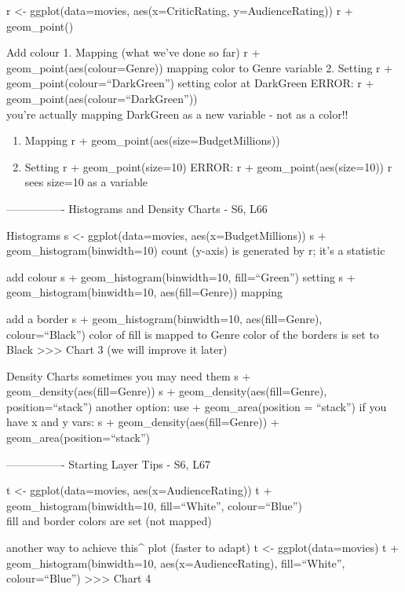 \documentclass[]{article}
\providecommand{\tightlist}{%
  \setlength{\itemsep}{0pt}\setlength{\parskip}{0pt}}
\begin{document}
r \textless{}- ggplot(data=movies, aes(x=CriticRating,
y=AudienceRating)) r + geom\_point()

Add colour 1. Mapping (what we've done so far) r +
geom\_point(aes(colour=Genre)) mapping color to Genre variable 2.
Setting r + geom\_point(colour=``DarkGreen'') setting color at DarkGreen
ERROR: r + geom\_point(aes(colour=``DarkGreen''))\\
you're actually mapping DarkGreen as a new variable - not as a color!!

\begin{enumerate}
\def\labelenumi{\arabic{enumi}.}
\tightlist
\item
  Mapping r + geom\_point(aes(size=BudgetMillions))
\item
  Setting r + geom\_point(size=10) ERROR: r + geom\_point(aes(size=10))
  r sees size=10 as a variable
\end{enumerate}

---------------- Histograms and Density Charts - S6, L66

Histograms s \textless{}- ggplot(data=movies, aes(x=BudgetMillions)) s +
geom\_histogram(binwidth=10) count (y-axis) is generated by r; it's a
statistic

add colour s + geom\_histogram(binwidth=10, fill=``Green'') setting s +
geom\_histogram(binwidth=10, aes(fill=Genre)) mapping

add a border s + geom\_histogram(binwidth=10, aes(fill=Genre),
colour=``Black'') color of fill is mapped to Genre color of the borders
is set to Black \textgreater{}\textgreater{}\textgreater{} Chart 3 (we
will improve it later)

Density Charts sometimes you may need them s +
geom\_density(aes(fill=Genre)) s + geom\_density(aes(fill=Genre),
position=``stack'') another option: use + geom\_area(position =
``stack'') if you have x and y vars: s + geom\_density(aes(fill=Genre))
+ geom\_area(position=``stack'')

---------------- Starting Layer Tips - S6, L67

t \textless{}- ggplot(data=movies, aes(x=AudienceRating)) t +
geom\_histogram(binwidth=10, fill=``White'', colour=``Blue'')\\
fill and border colors are set (not mapped)

another way to achieve this\^{} plot (faster to adapt) t \textless{}-
ggplot(data=movies) t + geom\_histogram(binwidth=10,
aes(x=AudienceRating), fill=``White'', colour=``Blue'')
\textgreater{}\textgreater{}\textgreater{} Chart 4
\end{document}
